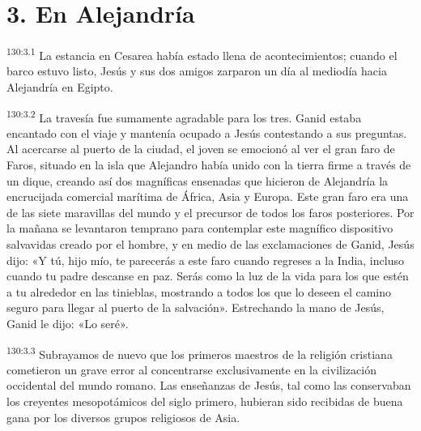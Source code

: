 \section*{3. En Alejandría}
\par 
\textsuperscript{130:3.1} La estancia en Cesarea había estado llena de acontecimientos; cuando el barco estuvo listo, Jesús y sus dos amigos zarparon un día al mediodía hacia Alejandría en Egipto.

\par 
\textsuperscript{130:3.2} La travesía fue sumamente agradable para los tres. Ganid estaba encantado con el viaje y mantenía ocupado a Jesús contestando a sus preguntas. Al acercarse al puerto de la ciudad, el joven se emocionó al ver el gran faro de Faros, situado en la isla que Alejandro había unido con la tierra firme a través de un dique, creando así dos magníficas ensenadas que hicieron de Alejandría la encrucijada comercial marítima de África, Asia y Europa. Este gran faro era una de las siete maravillas del mundo y el precursor de todos los faros posteriores. Por la mañana se levantaron temprano para contemplar este magnífico dispositivo salvavidas creado por el hombre, y en medio de las exclamaciones de Ganid, Jesús dijo: «Y tú, hijo mío, te parecerás a este faro cuando regreses a la India, incluso cuando tu padre descanse en paz. Serás como la luz de la vida para los que estén a tu alrededor en las tinieblas, mostrando a todos los que lo deseen el camino seguro para llegar al puerto de la salvación». Estrechando la mano de Jesús, Ganid le dijo: «Lo seré».

\par 
\textsuperscript{130:3.3} Subrayamos de nuevo que los primeros maestros de la religión cristiana cometieron un grave error al concentrarse exclusivamente en la civilización occidental del mundo romano. Las enseñanzas de Jesús, tal como las conservaban los creyentes mesopotámicos del siglo primero, hubieran sido recibidas de buena gana por los diversos grupos religiosos de Asia.


